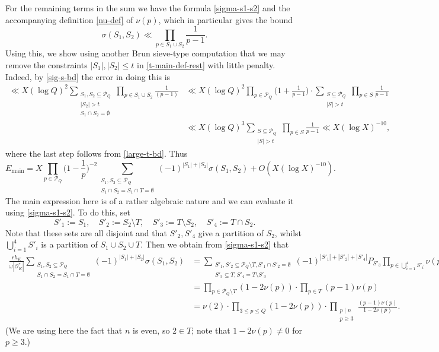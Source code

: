 \documentclass[11pt,reqno]{amsart}
\numberwithin{equation}{section}
\theoremstyle{definition}
\theoremstyle{remark}
\newcommand{\mc}{\mathcal}
\renewcommand{\le}{\leqslant}
\renewcommand{\ge}{\geqslant}
\newcommand\main{{\textnormal{main}}}
\renewcommand\main{\operatorname{main}}
\renewcommand\O{\mathcal{O}}
\begin{document}
For the remaining terms in the sum we have the formula \cref{sigma-s1-s2} and the accompanying definition \cref{nu-def} of $\nu(p)$, which in particular gives the bound
\begin{equation}\label{sig-s-bd} \sigma(S_1, S_2) \ll \prod_{p \in S_1 \cup S_2} \frac{1}{p-1} .\end{equation}
Using this, we show using another Brun sieve-type computation that we may remove the constraints $|S_1|, |S_2| \le t$ in \cref{t-main-def-rest} with little penalty. Indeed, by \cref{sig-s-bd} the error in doing this is 
\begin{align*} \ll X (\log Q)^2  \sum_{\substack{S_1, S_2 \subseteq \mc{P}_Q \\ |S_2| > t \\ S_1 \cap S_2 = \emptyset}} \prod_{p \in S_1 \cup S_2} \frac{1}{(p-1)} & \ll X(\log Q)^2 \prod_{p \in \mc{P}_Q} \Big(1 + \frac{1}{p-1}\Big) \cdot \sum_{\substack{S \subseteq \mc{P}_Q \\ |S| > t}} \prod_{p \in S}\frac{1}{p-1} \\ & \ll X (\log Q)^3 \sum_{\substack{S \subseteq \mc{P}_Q \\ |S| > t}} \prod_{p \in S}\frac{1}{p-1} \ll X(\log X)^{-10},\end{align*} where the last step follows from \cref{large-t-bd}. Thus
\begin{equation}\label{t-main-complete} E_{\main} = X \prod_{p \in \mc{P}_Q} \Big(1 - \frac{1}{p}\Big)^{-2} \sum_{\substack{S_1, S_2 \subseteq \mc{P}_Q \\ S_1 \cap S_2 = S_1 \cap T = \emptyset }} (-1)^{|S_1| + |S_2|} \sigma(S_1, S_2)  + O(X (\log X)^{-10}).\end{equation}
The main expression here is of a rather algebraic nature and we can evaluate it using \cref{sigma-s1-s2}. To do this, set
\[ S'_1 := S_1, \quad S'_2 := S_2 \setminus T,\quad S'_3 := T \setminus S_2, \quad S'_4 := T \cap S_2.\] Note that these sets are all disjoint and that $S'_2, S'_4$ give a partition of $S_2$, whilst $\bigcup_{i = 1}^4 S'_i$ is a partition of $S_1 \cup S_2 \cup T$. Then we obtain from \cref{sigma-s1-s2} that 
\begin{align}\nonumber
\frac{rh_K}{\omega|\O^*_K|} \sum_{\substack{S_1, S_2 \subseteq \mc{P}_Q \\ S_1 \cap S_2 = S_1 \cap T = \emptyset}} (-1)^{|S_1| + |S_2|}\sigma(S_1, S_2) & = \sum_{\substack{S'_1, S'_2 \subseteq \mc{P}_Q \setminus T, S'_1 \cap S'_2 = \emptyset \\ S'_3 \subseteq T, S'_4 = T \setminus S'_3 }} (-1)^{|S'_1| + |S'_2| + |S'_4|} P_{S'_3}\prod_{p \in \bigcup_{i=1}^4 S'_i} \nu(p) \\ & = \prod_{p \in \mc{P}_Q \setminus T} (1 - 2 \nu(p)) \cdot \prod_{p \in T} (p-1)\nu(p) \nonumber \\ & = \nu(2) \cdot \prod_{3 \le p \le Q} (1 - 2 \nu(p)) \cdot \prod_{\substack{p \mid n \\ p \ge 3}}
 \frac{(p-1)\nu(p)}{1 - 2 \nu(p)}.\label{big-prod-form}\end{align}
 (We are using here the fact that $n$ is even, so $2 \in T$; note that $1 - 2 \nu(p) \ne 0$ for $p \ge 3$.)
 
\end{document}
